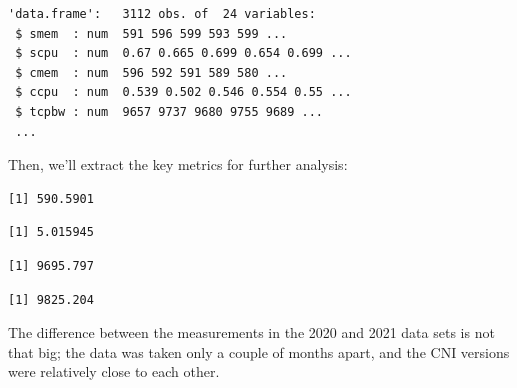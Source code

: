 \begin{verbatim}
'data.frame':   3112 obs. of  24 variables:
 $ smem  : num  591 596 599 593 599 ...
 $ scpu  : num  0.67 0.665 0.699 0.654 0.699 ...
 $ cmem  : num  596 592 591 589 580 ...
 $ ccpu  : num  0.539 0.502 0.546 0.554 0.55 ...
 $ tcpbw : num  9657 9737 9680 9755 9689 ...
 ...
\end{verbatim}

Then, we'll extract the key metrics for further analysis:

\begin{Shaded}
\begin{Highlighting}[]
\SpecialCharTok{\$}
\end{Highlighting}
\end{Shaded}

\begin{verbatim}
[1] 590.5901
\end{verbatim}

\begin{Shaded}
\begin{Highlighting}[]
\SpecialCharTok{\$}
\end{Highlighting}
\end{Shaded}

\begin{verbatim}
[1] 5.015945
\end{verbatim}

\begin{Shaded}
\begin{Highlighting}[]
\SpecialCharTok{\$}
\end{Highlighting}
\end{Shaded}

\begin{verbatim}
[1] 9695.797
\end{verbatim}

\begin{Shaded}
\begin{Highlighting}[]
\SpecialCharTok{\$}
\end{Highlighting}
\end{Shaded}

\begin{verbatim}
[1] 9825.204
\end{verbatim}

The difference between the measurements in the 2020 and 2021 data sets is not that big; the data was taken only a couple of months apart, and the CNI versions were relatively close to each other.

